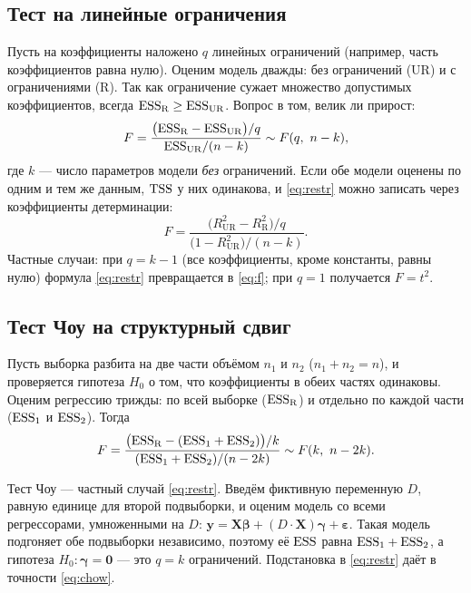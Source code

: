 \subsection{Тест на линейные ограничения}\label{sec:restr}

Пусть на коэффициенты наложено $q$ линейных ограничений (например, часть
коэффициентов равна нулю). Оценим модель дважды: без ограничений (UR) и с
ограничениями (R). Так как ограничение сужает множество допустимых
коэффициентов, всегда $\mathrm{ESS}_{\mathrm{R}} \ge \mathrm{ESS}_{\mathrm{UR}}$. Вопрос в том,
велик ли прирост:
\begin{equation}
  F = \frac{\bigl(\mathrm{ESS}_{\mathrm{R}} - \mathrm{ESS}_{\mathrm{UR}}\bigr)/q}
           {\mathrm{ESS}_{\mathrm{UR}}/(n-k)} \sim F(q,\ n-k),
  \label{eq:restr}
\end{equation}
где $k$ — число параметров модели \emph{без} ограничений. Если обе модели
оценены по одним и тем же данным, $\mathrm{TSS}$ у них одинакова, и \eqref{eq:restr}
можно записать через коэффициенты детерминации:
\[
  F = \frac{\bigl(R^2_{\mathrm{UR}} - R^2_{\mathrm{R}}\bigr)/q}
           {\bigl(1 - R^2_{\mathrm{UR}}\bigr)/(n-k)} .
\]
Частные случаи: при $q = k-1$ (все коэффициенты, кроме константы, равны нулю)
формула \eqref{eq:restr} превращается в \eqref{eq:f}; при $q = 1$ получается
$F = t^2$.

\subsection{Тест Чоу на структурный сдвиг}\label{sec:chow}

Пусть выборка разбита на две части объёмом $n_1$ и $n_2$ ($n_1 + n_2 = n$), и
проверяется гипотеза $H_0$ о том, что коэффициенты в обеих частях одинаковы.
Оценим регрессию трижды: по всей выборке ($\mathrm{ESS}_{\mathrm{R}}$) и отдельно по
каждой части ($\mathrm{ESS}_1$ и $\mathrm{ESS}_2$). Тогда
\begin{equation}
  F = \frac{\bigl(\mathrm{ESS}_{\mathrm{R}} - (\mathrm{ESS}_1 + \mathrm{ESS}_2)\bigr)/k}
           {(\mathrm{ESS}_1 + \mathrm{ESS}_2)/(n - 2k)} \sim F(k,\ n-2k).
  \label{eq:chow}
\end{equation}

\begin{remark}
Тест Чоу — частный случай \eqref{eq:restr}. Введём фиктивную переменную $D$,
равную единице для второй подвыборки, и оценим модель со всеми регрессорами,
умноженными на $D$: $\mathbf{y} = \mathbf{X}\boldsymbol{\beta} +
(D\cdot\mathbf{X})\boldsymbol{\gamma} + \boldsymbol{\varepsilon}$. Такая модель
подгоняет обе подвыборки независимо, поэтому её $\mathrm{ESS}$ равна $\mathrm{ESS}_1 + \mathrm{ESS}_2$,
а гипотеза $H_0\colon \boldsymbol{\gamma} = \mathbf{0}$ — это $q = k$
ограничений. Подстановка в \eqref{eq:restr} даёт в точности \eqref{eq:chow}.
\end{remark}

